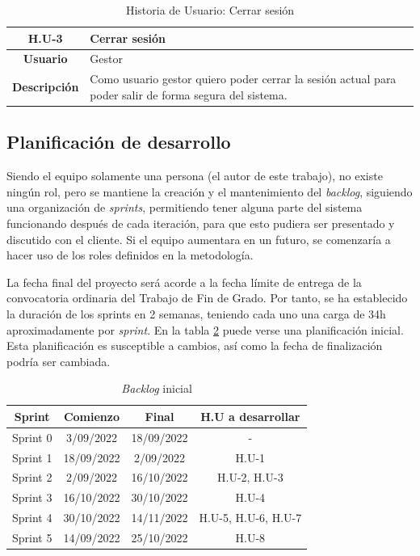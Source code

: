 \begin{table}[!h]
	\begin{center}
		\begin{tabular}{|c|p{10cm}|}
			\hline \textbf{H.U-3} & Cerrar sesión \\ 
			\hline \textbf{Usuario} & Gestor \\ 
			\hline \textbf{Descripción} & Como usuario gestor quiero poder cerrar la sesión actual para poder salir de forma segura del sistema. \\ 
			\hline 
		\end{tabular}
		\caption{Historia de Usuario: Cerrar sesión}
		\label{tab:HU3}
	\end{center}
\end{table}

\subsection{Planificación de desarrollo}
Siendo el equipo solamente una persona (el autor de este trabajo), no existe ningún rol, pero se mantiene la creación y el mantenimiento del \textit{backlog}, siguiendo una organización de \textit{sprints}, permitiendo tener alguna parte del sistema funcionando después de cada iteración, para que esto pudiera ser presentado y discutido con el cliente. Si el equipo aumentara en un futuro, se comenzaría a hacer uso de los roles definidos en la metodología.

La fecha final del proyecto será acorde a la fecha límite de entrega de la convocatoria ordinaria del Trabajo de Fin de Grado. Por tanto, se ha establecido la duración de los sprints en 2 semanas, teniendo cada uno una carga de 34h aproximadamente por \textit{sprint}. En la tabla \ref{tab:sprints} puede verse una planificación inicial. Esta planificación es susceptible a cambios, así como la fecha de finalización podría ser cambiada.

\begin{table}[!h]
	\begin{center}
		\begin{tabular}{|c|c|c|c|}
			\hline \textbf{Sprint} & \textbf{Comienzo} & \textbf{Final} & \textbf{H.U a desarrollar} \\ 
			\hline Sprint 0 & 3/09/2022  & 18/09/2022 & -\\ 
			\hline Sprint 1 & 18/09/2022 & 2/09/2022 & H.U-1\\ 
			\hline Sprint 2 & 2/09/2022 & 16/10/2022 & H.U-2, H.U-3\\ 
			\hline Sprint 3 & 16/10/2022 & 30/10/2022 & H.U-4\\ 
			\hline Sprint 4 & 30/10/2022 & 14/11/2022 & H.U-5, H.U-6, H.U-7\\ 
			\hline Sprint 5 & 14/09/2022 & 25/10/2022 & H.U-8\\ 
			\hline 
		\end{tabular}
		\caption{\textit{Backlog} inicial}
		\label{tab:sprints}
	\end{center}
\end{table}

